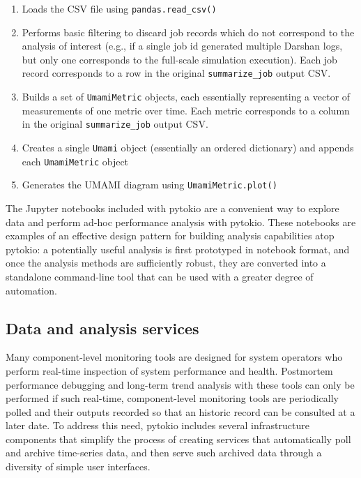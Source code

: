 \begin{enumerate}[leftmargin=*]
\item Loads the CSV file using \texttt{pandas.read\_csv()}
\item Performs basic filtering to discard job records which do not correspond to the analysis of interest (e.g., if a single job id generated multiple Darshan logs, but only one corresponds to the full-scale simulation execution).  Each job record corresponds to a row in the original \texttt{summarize\_job} output CSV.
\item Builds a set of \texttt{UmamiMetric} objects, each essentially representing a vector of measurements of one metric over time.  Each metric corresponds to a column in the original \texttt{summarize\_job} output CSV.
\item Creates a single \texttt{Umami} object (essentially an ordered dictionary) and appends each \texttt{UmamiMetric} object
\item Generates the UMAMI diagram using \texttt{UmamiMetric.plot()}
\end{enumerate}

The Jupyter notebooks included with pytokio are a convenient way to explore data and perform ad-hoc performance analysis with pytokio.
These notebooks are examples of an effective design pattern for building analysis capabilities atop pytokio: a potentially useful analysis is first prototyped in notebook format, and once the analysis methods are sufficiently robust, they are converted into a standalone command-line tool that can be used with a greater degree of automation.

\subsection{Data and analysis services} \label{sec:apps/services}

Many component-level monitoring tools are designed for system operators who perform real-time inspection of system performance and health.
Postmortem performance debugging and long-term trend analysis with these tools can only be performed if such real-time, component-level monitoring tools are periodically polled and their outputs recorded so that an historic record can be consulted at a later date.
To address this need, pytokio includes several infrastructure components that simplify the process of creating services that automatically poll and archive time-series data, and then serve such archived data through a diversity of simple user interfaces.

